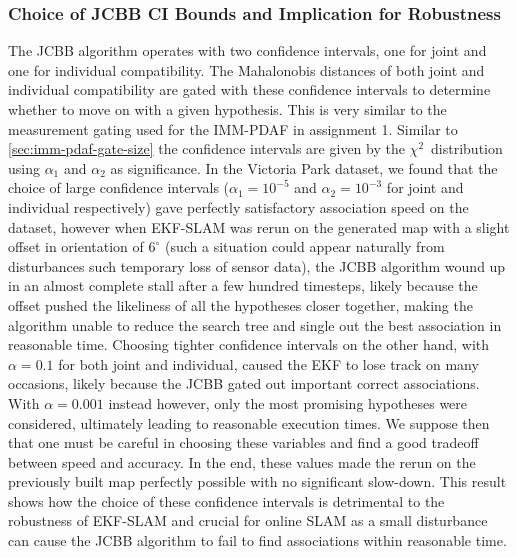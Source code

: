 \subsubsection{Choice of JCBB CI Bounds and Implication for Robustness}
The JCBB algorithm operates with two confidence intervals, one for joint and one for individual compatibility. The Mahalonobis distances of both joint and individual compatibility are gated with these confidence intervals to determine whether to move on with a given hypothesis.\cite{jcbb} This is very similar to the measurement gating used for the IMM-PDAF in assignment 1. Similar to \cref{sec:imm-pdaf-gate-size} the confidence intervals are given by the $\chi^2$ distribution using $\alpha_1$ and $\alpha_2$ as significance. In the Victoria Park dataset, we found that the choice of large confidence intervals ($\alpha_1 = 10^{-5}$ and $\alpha_2 = 10^{-3}$ for joint and individual respectively) gave perfectly satisfactory association speed on the dataset, however when EKF-SLAM was rerun on the generated map with a slight offset in orientation of $6^\circ$ (such a situation could appear naturally from disturbances such temporary loss of sensor data), the JCBB algorithm wound up in an almost complete stall after a few hundred timesteps, likely because the offset pushed the likeliness of all the hypotheses closer together, making the algorithm unable to reduce the search tree and single out the best association in reasonable time. Choosing tighter confidence intervals on the other hand, with $\alpha = 0.1$ for both joint and individual, caused the EKF to lose track on many occasions, likely because the JCBB gated out important correct associations. With $\alpha = 0.001$ instead however, only the most promising hypotheses were considered, ultimately leading to reasonable execution times. We suppose then that one must be careful in choosing these variables and find a good tradeoff between speed and accuracy. In the end, these values made the rerun on the previously built map perfectly possible with no significant slow-down. This result shows how the choice of these confidence intervals is detrimental to the robustness of EKF-SLAM and crucial for online SLAM as a small disturbance can cause the JCBB algorithm to fail to find associations within reasonable time.

